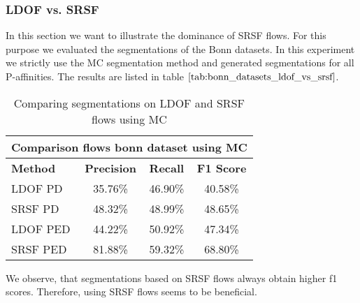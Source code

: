 \subsubsection{LDOF vs. SRSF}
In this section we want to illustrate the dominance of SRSF flows. For this purpose we evaluated the segmentations of the Bonn datasets. In this experiment we strictly use the MC segmentation method and generated segmentations for all P-affinities. The results are listed in table $\ref{tab:bonn_datasets_ldof_vs_srsf}$.
\begin{table}[H]
\centering
\begin{tabular}{|l|c|c|c|}
\hline
\multicolumn{4}{|c|}{Comparison flows bonn dataset using MC}                        \\ \hline
\textbf{Method} & \textbf{Precision} & \textbf{Recall} & \textbf{F1 Score}  \\ \hline
LDOF PD & 35.76\% & 46.90\% & 40.58\% \\ \hline
SRSF PD & 48.32\% & 48.99\% & 48.65\% \\ \hline
LDOF PED & 44.22\% & 50.92\% & 47.34\% \\ \hline
SRSF PED & 81.88\% & 59.32\% & 68.80\% \\ \hline
\end{tabular}
\caption[LDOF vs. SRSF: Bonn Datasets]{Comparing segmentations on LDOF and SRSF flows using MC}
\label{tab:bonn_datasets_ldof_vs_srsf}
\end{table}
We observe, that segmentations based on SRSF flows always obtain higher f1 scores. Therefore, using SRSF flows seems to be beneficial.

